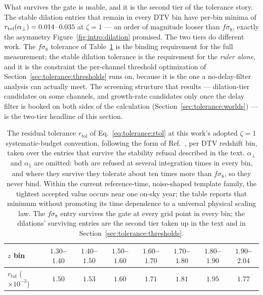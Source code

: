 What survives the gate is usable, and it is the second tier of the tolerance story. The stable dilation entries that remain in every DTV bin have per-bin minima of $r_{\rm tol}(\alpha_\perp) = 0.014$--$0.035$ at $\zeta = 1$ --- an order of magnitude looser than $f\sigma_8$, exactly the asymmetry Figure~\ref{fig:intro:dilation} promised. The two tiers do different work. The $f\sigma_8$ tolerance of Table~\ref{tab:tolerance:rtol} is the binding requirement for the full measurement; the stable dilation tolerance is the requirement for the \emph{ruler alone}, and it is the constraint the per-channel threshold optimization of Section~\ref{sec:tolerance:thresholds} runs on, because it is the one a no-delay-filter analysis can actually meet. The screening structure that results --- dilation-tier candidates on some channels, and growth-rate candidates only once the delay filter is booked on both sides of the calculation (Section~\ref{sec:tolerance:worlds}) --- is the two-tier headline of this section.

\begin{table}[t]
\centering
\caption[The residual tolerance by parameter and redshift bin]{The residual tolerance $r_{\text{tol}}$ of Eq.~\eqref{eq:tolerance:rtol} at this work's adopted $\zeta = 1$ systematic-budget convention, following the form of Ref.~\cite{amara2008}, per DTV redshift bin, taken over the entries that survive the stability refusal described in the text. $\alpha_\perp$ and $\alpha_\parallel$ are omitted: both are refused at several integration times in every bin, and where they survive they tolerate about ten times more than $f\sigma_8$, so they never bind. Within the current reference-time, noise-shaped template family, the tightest accepted value occurs near one on-sky year; the table reports that minimum without promoting its time dependence to a universal physical scaling law. The $f\sigma_8$ entry survives the gate at every grid point in every bin; the dilations' surviving entries are the second tier taken up in the text and in Section~\ref{sec:tolerance:thresholds}.}
\label{tab:tolerance:rtol}
\begin{tabular}{lccccccc}
\toprule
$z$ bin & $1.30$--$1.40$ & $1.40$--$1.50$ & $1.50$--$1.60$ & $1.60$--$1.70$ & $1.70$--$1.80$ & $1.80$--$1.90$ & $1.90$--$2.04$ \\
\midrule
$r_{\text{tol}}$ ($\times 10^{-3}$) & $1.50$ & $1.53$ & $1.60$ & $1.71$ & $1.81$ & $1.95$ & $1.77$ \\
\bottomrule
\end{tabular}
\end{table}

